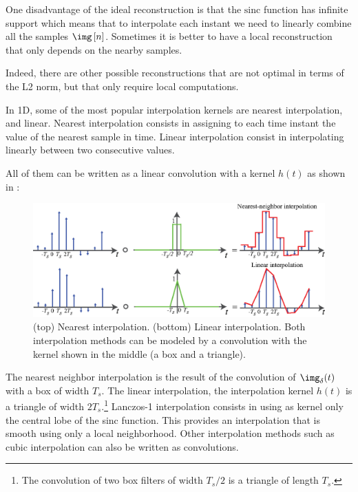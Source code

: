 One disadvantage of the ideal reconstruction is that the $\text{sinc}$ function has infinite support which means that to interpolate each instant we need to linearly combine all the samples $\img \left[n \right]$. Sometimes it is better to have a local reconstruction that only depends on the nearby samples. 

Indeed, there are other possible reconstructions that are not optimal in terms of the L2 norm, but that only require local computations. 

In 1D, some of the most popular interpolation kernels are nearest interpolation, and linear. Nearest interpolation consists in assigning to each time instant the value of the nearest sample in time. Linear interpolation consist in interpolating linearly between two consecutive values.

All of them can be written as a linear convolution with a kernel $h(t)$ as shown in \fig{\ref{fig:sampling_reconstruction3}}:

\begin{figure}
\centerline{
\includegraphics[width=1\linewidth]{figures/Image_processing_sampling/sampling_reconstruction3.eps}
}
\caption{(top) Nearest interpolation. (bottom) Linear interpolation. Both interpolation methods can be modeled by a convolution with the kernel shown in the middle (a box and a triangle).}
\label{fig:sampling_reconstruction3}
\end{figure}

The nearest neighbor interpolation is the result of the convolution of $\img_\delta (t)$ with a box of width $T_s$. The linear interpolation, the interpolation kernel $h(t)$ is a triangle of width $2T_s$.\footnote{The convolution of two box filters of width $T_s/2$ is a triangle of length $T_s$.}  
Lanczos-1 interpolation 
consists in using as kernel only the central lobe of the sinc function. This provides an interpolation that is smooth using only a local neighborhood. Other interpolation methods such as cubic interpolation can also be written as convolutions. 

